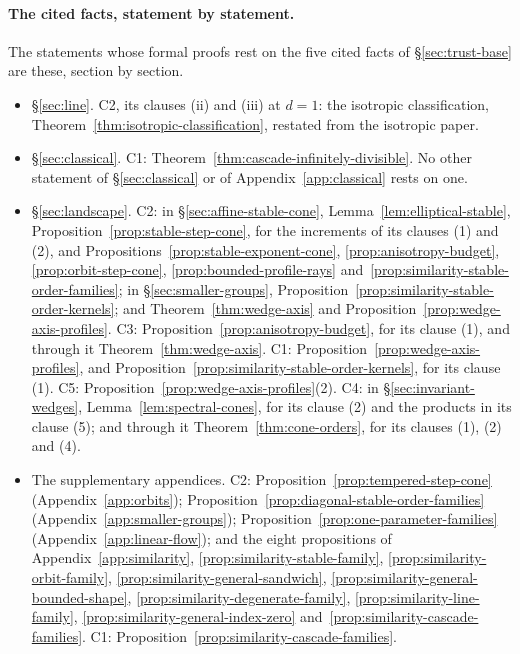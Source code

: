 \paragraph{The cited facts, statement by statement.} The statements whose formal proofs rest on the
five cited facts of \S\ref{sec:trust-base} are these, section by section.
\begin{itemize}
\item \S\ref{sec:line}. C2, its clauses (ii) and (iii) at $d = 1$: the isotropic classification,
Theorem~\ref{thm:isotropic-classification}, restated from the isotropic paper.
\item \S\ref{sec:classical}. C1: Theorem~\ref{thm:cascade-infinitely-divisible}. No other statement
of \S\ref{sec:classical} or of Appendix~\ref{app:classical} rests on one.
\item \S\ref{sec:landscape}. C2: in \S\ref{sec:affine-stable-cone},
Lemma~\ref{lem:elliptical-stable}, Proposition~\ref{prop:stable-step-cone}, for the increments of its
clauses (1) and (2), and Propositions~\ref{prop:stable-exponent-cone}, \ref{prop:anisotropy-budget}, \ref{prop:orbit-step-cone},
\ref{prop:bounded-profile-rays} and~\ref{prop:similarity-stable-order-families}; in
\S\ref{sec:smaller-groups}, Proposition~\ref{prop:similarity-stable-order-kernels}; and
Theorem~\ref{thm:wedge-axis} and Proposition~\ref{prop:wedge-axis-profiles}. C3:
Proposition~\ref{prop:anisotropy-budget}, for its clause (1), and through it
Theorem~\ref{thm:wedge-axis}. C1: Proposition~\ref{prop:wedge-axis-profiles}, and
Proposition~\ref{prop:similarity-stable-order-kernels}, for its clause (1). C5:
Proposition~\ref{prop:wedge-axis-profiles}(2). C4: in \S\ref{sec:invariant-wedges}, Lemma~\ref{lem:spectral-cones}, for its
clause (2) and the products in its clause (5); and through it Theorem~\ref{thm:cone-orders}, for its
clauses (1), (2) and (4).
\item The supplementary appendices. C2: Proposition~\ref{prop:tempered-step-cone}
(Appendix~\ref{app:orbits}); Proposition~\ref{prop:diagonal-stable-order-families}
(Appendix~\ref{app:smaller-groups}); Proposition~\ref{prop:one-parameter-families}
(Appendix~\ref{app:linear-flow}); and the eight propositions of Appendix~\ref{app:similarity},
\ref{prop:similarity-stable-family}, \ref{prop:similarity-orbit-family},
\ref{prop:similarity-general-sandwich}, \ref{prop:similarity-general-bounded-shape},
\ref{prop:similarity-degenerate-family}, \ref{prop:similarity-line-family},
\ref{prop:similarity-general-index-zero} and~\ref{prop:similarity-cascade-families}. C1:
Proposition~\ref{prop:similarity-cascade-families}.
\end{itemize}
